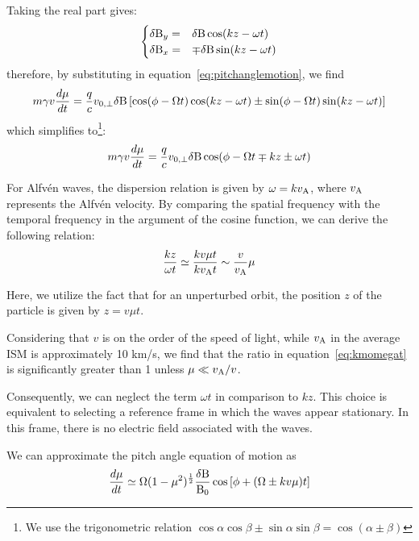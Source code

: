 Taking the real part gives:
%
\begin{equation}
\begin{cases}\delta {\rm B}_y = & \delta {\rm B} \cos (kz - \omega t) \\
\delta {\rm B}_x = & \mp\delta {\rm B} \sin (kz - \omega t) 
\end{cases}
\end{equation}
%
therefore, by substituting in equation~\eqref{eq:pitchanglemotion}, we find
%
\begin{equation}
m\gamma v \frac{d\mu}{dt} = 
\frac{q}{c}v_{0,\perp} \delta{\rm B} \left[\cos(\phi-\Omega t) \cos (kz - \omega t) \pm \sin(\phi - \Omega t) \sin (kz - \omega t)\right]
\end{equation}
%
which simplifies to\footnote{We use the trigonometric relation $\cos \alpha \cos \beta \pm \sin \alpha \sin \beta = \cos (\alpha \pm \beta)$}:
%
\begin{equation}
m\gamma v \frac{d\mu}{dt} = 
\frac{q}{c}v_{0,\perp} \delta {\rm B} \cos(\phi-\Omega t \mp kz \pm \omega t)
\end{equation}

For Alfvén waves, the dispersion relation is given by $\omega = k v_{\rm A}$, where $v_{\rm A}$ represents the Alfvén velocity. By comparing the spatial frequency with the temporal frequency in the argument of the cosine function, we can derive the following relation:
%
\begin{equation}
\frac{kz}{\omega t} \simeq \frac{k v \mu t}{k v_{\rm A} t} \sim \frac{v}{v_{\rm A}} \mu
\label{eq:kmomegat}
\end{equation}

Here, we utilize the fact that for an unperturbed orbit, the position $z$ of the particle is given by $z = v \mu t$.

Considering that $v$ is on the order of the speed of light, while $v_{\rm A}$ in the average ISM is approximately 10 km/s, we find that the ratio in equation~\eqref{eq:kmomegat} is significantly greater than 1 unless $\mu \ll v_{\rm A} / v$.

Consequently, we can neglect the term $\omega t$ in comparison to $kz$. This choice is equivalent to selecting a reference frame in which the waves appear stationary. In this frame, there is no electric field associated with the waves.

We can approximate the pitch angle equation of motion as
%
\begin{equation}
\frac{d\mu}{dt} \simeq \Omega
(1-\mu^2)^{\frac 1 2} \frac{\delta {\rm B}}{{\rm B}_0} \cos\left[\phi + (\Omega \pm k v \mu) t \right]
\end{equation}

